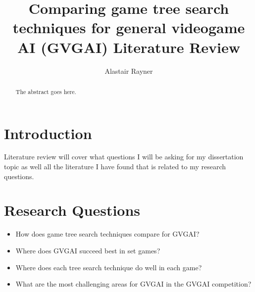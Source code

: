 \documentclass[journal]{IEEEtran}
\begin{document}
%
\title{Comparing game tree search techniques for general videogame AI (GVGAI) Literature Review}
%
%
\author{Alastair Rayner}


\maketitle

\begin{abstract}
The abstract goes here.
\end{abstract}

\section{Introduction}
 Literature review will cover what questions I will be asking for my dissertation topic as well all the literature I have found that is related to my research questions.




\section{Research Questions}

\begin{itemize}
    \item How does game tree search techniques compare for GVGAI?
    \item Where does GVGAI succeed best in set games?
    \item Where does each tree search technique do well in each game?
    \item What are the most challenging areas for GVGAI in the GVGAI competition?
\end{itemize}
\end{document}
